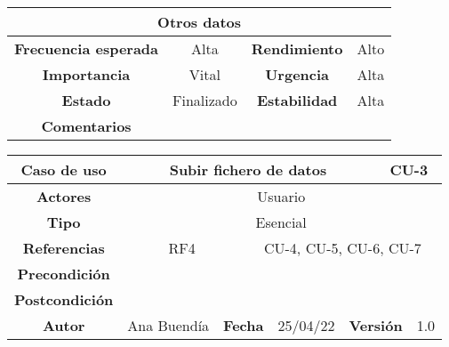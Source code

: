 \begin{table}[!h]
\begin{tabular}{|c|c|c|c|}
\hline
\multicolumn{4}{|c|}{\cellcolor{cyan} \textbf{Otros datos}} \\
\hline
 \cellcolor{cyan} \textbf{Frecuencia esperada}             &      Alta         &    \cellcolor{cyan} \textbf{Rendimiento}          &      Alto        \\
\hline
 \cellcolor{cyan} \textbf{Importancia}             &      Vital         &     \cellcolor{cyan} \textbf{Urgencia}         &      Alta        \\
\hline
 \cellcolor{cyan} \textbf{Estado}             &       Finalizado        &    \cellcolor{cyan} \textbf{Estabilidad}          &    Alta          \\
\hline
 \cellcolor{cyan} \textbf{Comentarios}        &  \multicolumn{3}{|c|}{} \\
\hline
\end{tabular}
\end{table}






\clearpage

\begin{table}[!h]
\begin{tabular}{|c|c|c|c|c|c|c|c|}
\hline
\rowcolor{cyan} \textbf{Caso de uso} & \multicolumn{5}{|c|}{Subir fichero de datos} & \multicolumn{2}{|c|}{CU-3} \\
\hline
\cellcolor{cyan} \textbf{Actores}              & \multicolumn{7}{|c|}{Usuario}           \\
\hline
\cellcolor{cyan} \textbf{Tipo}                 & \multicolumn{7}{|c|}{Esencial}             \\
\hline
\cellcolor{cyan} \textbf{Referencias}          & \multicolumn{2}{|c|}{RF4}           & \multicolumn{5}{|c|}{CU-4, CU-5, CU-6, CU-7}\\
\hline
\cellcolor{cyan} \textbf{Precondición}         & \multicolumn{7}{|c|}{}             \\
\hline
\cellcolor{cyan} \textbf{Postcondición}        & \multicolumn{7}{|c|}{}              \\
\hline
\cellcolor{cyan} \textbf{Autor}                &   Ana Buendía  & \multicolumn{2}{|c|}{\cellcolor{cyan} \textbf{Fecha}} &  25/04/22   & \multicolumn{2}{|c|}{\cellcolor{cyan} \textbf{Versión}} & 1.0  \\
\hline
\end{tabular}
\end{table}

